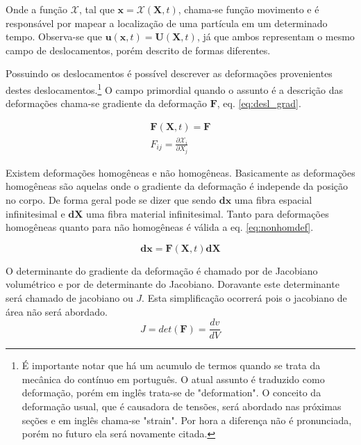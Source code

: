 Onde a função $ \mathcal{X} $, tal que $ \boldsymbol{x} = \mathcal{X}(\boldsymbol{X},t) $, chama-se função movimento e é responsável por mapear a localização de uma partícula em um determinado tempo. Observa-se que $ \boldsymbol{u}(\boldsymbol{x},t) =  \boldsymbol{U}(\boldsymbol{X},t)  $, já que ambos representam o mesmo campo de deslocamentos, porém descrito de formas diferentes. \par

Possuindo os deslocamentos é possível descrever as deformações provenientes destes deslocamentos.\footnote{É importante notar que há um acumulo de termos quando se trata da mecânica do contínuo em português. O atual assunto é traduzido como deformação, porém em inglês trata-se de "deformation". O conceito da deformação usual, que é causadora de tensões, será abordado nas próximas seções e em inglês chama-se "strain". Por hora a diferença não é pronunciada, porém no futuro ela será novamente citada.} O campo primordial quando o assunto é a descrição das deformações chama-se gradiente da deformação $ \boldsymbol{F} $, eq. \ref{eq:desl_grad}.

\begin{align}\label{eq:desl_grad}
    \boldsymbol{F}(\boldsymbol{X},t) = \boldsymbol{F} \\
    F_{ij} = \frac{\partial \mathcal{X}_i}{\partial X_j}
\end{align}

Existem deformações homogêneas e não homogêneas. Basicamente as deformações homogêneas são aquelas onde o gradiente da deformação é independe da posição no corpo. De forma geral pode se dizer que sendo $ \boldsymbol{dx} $ uma fibra espacial infinitesimal e $ \boldsymbol{dX} $ uma fibra material infinitesimal. Tanto para deformações homogêneas quanto para não homogêneas é válida a eq. \ref{eq:nonhomdef}.

\begin{equation}
    \boldsymbol{dx} = \boldsymbol{F}(\boldsymbol{X},t) \boldsymbol{dX}
    \label{eq:nonhomdef}
\end{equation}

O determinante do gradiente da deformação é chamado por \cite{gurtin_fried_anand_2013} de Jacobiano volumétrico e por \cite{hiermaier_2008} de determinante do Jacobiano. Doravante este determinante será chamado de jacobiano ou $ J $. Esta simplificação ocorrerá pois o jacobiano de área não será abordado.
\begin{equation}
    J = det(\boldsymbol{F}) = \frac{dv}{dV}
\end{equation}

